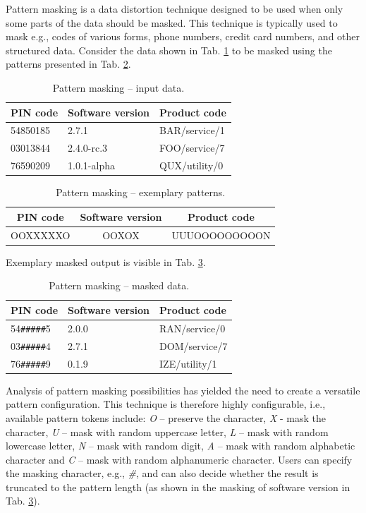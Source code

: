 \documentclass[a4paper,twoside,12pt]{book}
\begin{document}
Pattern masking is a data distortion technique designed to be used when only some parts of the data should be masked. This technique is typically used to mask e.g., codes of various forms, phone numbers, credit card numbers, and other structured data. 
%
Consider the data shown in Tab. \ref{id:tab:pattern_masking_raw} to be masked using the patterns presented in Tab. \ref{id:tab:pattern_masking_patterns}.
%
\begin{table}%
\centering
\caption{Pattern masking – input data.}
\label{id:tab:pattern_masking_raw}
\begin{tabular}{lll}
\toprule
PIN code & Software version & Product code  \\ \midrule
54850185 & 2.7.1            & BAR/service/1 \\
03013844 & 2.4.0-rc.3       & FOO/service/7 \\
76590209 & 1.0.1-alpha      & QUX/utility/0 \\ \bottomrule
\end{tabular}
\end{table}
%
\begin{table}%
\centering
\caption{Pattern masking – exemplary patterns.}
\label{id:tab:pattern_masking_patterns}
\begin{tabular}{ccc}
\toprule
PIN code & Software version & Product code  \\ \midrule
OOXXXXXO & OOXOX            & UUUOOOOOOOOON \\ \bottomrule
\end{tabular}
\end{table}
%
Exemplary masked output is visible in Tab. \ref{id:tab:pattern_masking_masked}.
%
\begin{table}%
\centering
\caption{Pattern masking – masked data.}
\label{id:tab:pattern_masking_masked}
\begin{tabular}{lll}
\toprule
PIN code & Software version & Product code  \\ \midrule
54\verb|#####|5 & 2.0.0 & RAN/service/0 \\
03\verb|#####|4 & 2.7.1 & DOM/service/7 \\
76\verb|#####|9 & 0.1.9 & IZE/utility/1 \\ \bottomrule
\end{tabular}
\end{table}
%
Analysis of pattern masking possibilities has yielded the need to create a versatile pattern configuration. This technique is therefore highly configurable, i.e., available pattern tokens include: \textit{O} – preserve the character, \textit{X} - mask the character, \textit{U} – mask with random uppercase letter, \textit{L} – mask with random lowercase letter, \textit{N} – mask with random digit, \textit{A} – mask with random alphabetic character and \textit{C} – mask with random alphanumeric character.
%
Users can specify the masking character, e.g., \textit{\#}, and can also decide whether the result is truncated to the pattern length (as shown in the masking of software version in Tab. \ref{id:tab:pattern_masking_masked}).
\end{document}
